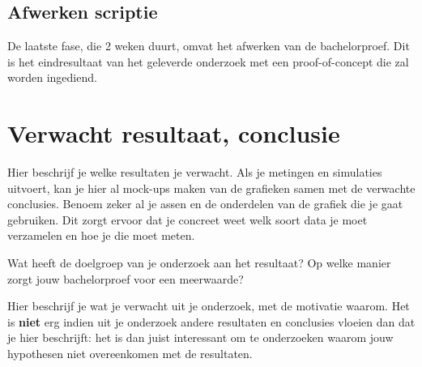 \subsection{Afwerken scriptie}
\label{sub:afwerken_scriptie}
De laatste fase, die 2 weken duurt, omvat het afwerken van de bachelorproef. Dit is het eindresultaat van het geleverde onderzoek met een proof-of-concept die zal worden ingediend. 


\section{Verwacht resultaat, conclusie}%
\label{sec:verwachte_resultaten}

Hier beschrijf je welke resultaten je verwacht. Als je metingen en simulaties uitvoert, kan je hier al mock-ups maken van de grafieken samen met de verwachte conclusies. Benoem zeker al je assen en de onderdelen van de grafiek die je gaat gebruiken. Dit zorgt ervoor dat je concreet weet welk soort data je moet verzamelen en hoe je die moet meten.

Wat heeft de doelgroep van je onderzoek aan het resultaat? Op welke manier zorgt jouw bachelorproef voor een meerwaarde?

Hier beschrijf je wat je verwacht uit je onderzoek, met de motivatie waarom. Het is \textbf{niet} erg indien uit je onderzoek andere resultaten en conclusies vloeien dan dat je hier beschrijft: het is dan juist interessant om te onderzoeken waarom jouw hypothesen niet overeenkomen met de resultaten.

